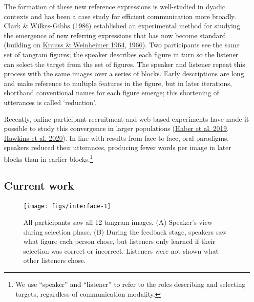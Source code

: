 \documentclass[
  english,
  a4paper,
]{article}
\begin{document}
The formation of these new reference expressions is well-studied in dyadic contexts and has been a case study for efficient communication more broadly. Clark \& Wilkes-Gibbs (\protect\hyperlink{ref-clarkReferringCollaborativeProcess1986}{1986}) established an experimental method for studying the emergence of new referring expressions that has now become standard (building on \protect\hyperlink{ref-kraussChangesReferencePhrases1964}{Krauss \& Weinheimer 1964}, \protect\hyperlink{ref-kraussConcurrentFeedbackConfirmation1966}{1966}). Two participants see the same set of tangram figures; the speaker describes each figure in turn so the listener can select the target from the set of figures. The speaker and listener repeat this process with the same images over a series of blocks. Early descriptions are long and make reference to multiple features in the figure, but in later iterations, shorthand conventional names for each figure emerge; this shortening of utterances is called `reduction'.

Recently, online participant recruitment and web-based experiments have made it possible to study this convergence in larger populations (\protect\hyperlink{ref-haber2019}{Haber et al. 2019}, \protect\hyperlink{ref-hawkinsCharacterizingDynamicsLearning2020}{Hawkins et al. 2020}). In line with results from face-to-face, oral paradigms, speakers reduced their utterances, producing fewer words per image in later blocks than in earlier blocks.\footnote{We use ``speaker'' and ``listener'' to refer to the roles describing and selecting targets, regardless of communication modality.}

\hypertarget{current-work}{%
\subsection{Current work}\label{current-work}}

\begin{figure}[t!]

{\centering \texttt{[image: figs/interface-1]} 

}

\caption{All participants saw all 12 tangram images. (A) Speaker's view during selection phase. (B) During the feedback stage, speakers saw what figure each person chose, but listeners only learned if their selection was correct or incorrect. Listeners were not shown what other listeners chose. \label{game}}\label{fig:interface}
\end{figure}
\end{document}
